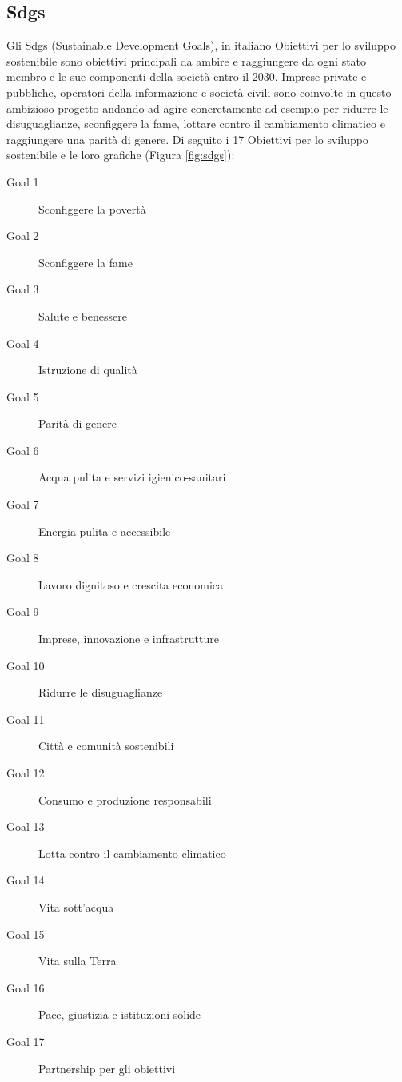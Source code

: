 \subsection{Sdgs}
\label{sec:sdgs}
Gli Sdgs (Sustainable Development Goals)\cite{agenda2030}, in italiano Obiettivi per lo sviluppo sostenibile sono obiettivi principali da ambire e raggiungere da ogni stato membro e le sue componenti della società entro il 2030. Imprese private e pubbliche, operatori della informazione e società civili sono coinvolte in questo ambizioso progetto andando ad agire concretamente ad esempio per ridurre le disuguaglianze, sconfiggere la fame, lottare contro il cambiamento climatico e raggiungere una parità di genere.
Di seguito i 17 Obiettivi per lo sviluppo sostenibile e le loro grafiche (Figura \ref{fig:sdgs}):
\begin{description}
    \item[Goal 1] Sconfiggere la povertà
    \item[Goal 2] Sconfiggere la fame
    \item[Goal 3] Salute e benessere
    \item[Goal 4] Istruzione di qualità
    \item[Goal 5] Parità di genere
    \item[Goal 6] Acqua pulita e servizi igienico-sanitari
    \item[Goal 7]  Energia pulita e accessibile
    \item[Goal 8] Lavoro dignitoso e crescita economica
    \item[Goal 9]  Imprese, innovazione e infrastrutture
    \item[Goal 10] Ridurre le disuguaglianze
    \item[Goal 11] Città e comunità sostenibili
    \item[Goal 12] Consumo e produzione responsabili
    \item[Goal 13] Lotta contro il cambiamento climatico
    \item[Goal 14] Vita sott’acqua
    \item[Goal 15] Vita sulla Terra
    \item[Goal 16] Pace, giustizia e istituzioni solide
    \item[Goal 17] Partnership per gli obiettivi
\end{description}
%
